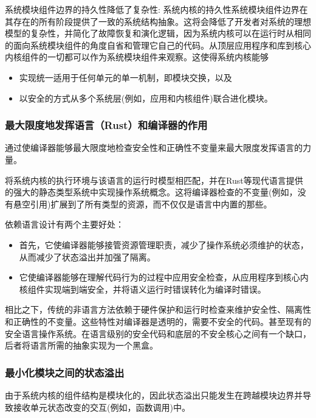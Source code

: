 系统模块组件边界的持久性降低了复杂性: 系统内核的持久性系统模块组件边界在其存在的所有阶段提供了一致的系统结构抽象。这将会降低了开发者对系统的理想模型的复杂性，并简化了故障恢复和演化逻辑，因为系统内核可以在运行时从相同的面向系统模块组件的角度自省和管理它自己的代码。从顶层应用程序和库到核心内核组件的一切都可以作为系统模块组件来观察。这使得系统内核能够

\begin{itemize}
	\item 实现统一适用于任何单元的单一机制，即模块交换，以及
	\item 以安全的方式从多个系统层(例如，应用和内核组件)联合进化模块。
\end{itemize}

\subsubsection{最大限度地发挥语言（Rust）和编译器的作用}
通过使编译器能够最大限度地检查安全性和正确性不变量来最大限度发挥语言的力量。

将系统内核的执行环境与该语言的运行时模型相匹配，并在Rust等现代语言提供的强大的静态类型系统中实现操作系统概念。这将编译器检查的不变量(例如，没有悬空引用)扩展到了所有类型的资源，而不仅仅是语言中内置的那些。

依赖语言设计有两个主要好处：

\begin{itemize}
    \item 首先，它使编译器能够接管资源管理职责，减少了操作系统必须维护的状态，从而减少了状态溢出并加强了隔离。
    \item 它使编译器能够在理解代码行为的过程中应用安全检查，从应用程序到核心内核组件实现端到端安全，并将语义运行时错误转化为编译时错误。
\end{itemize}

相比之下，传统的非语言方法依赖于硬件保护和运行时检查来维护安全性、隔离性和正确性的不变量。这些特性对编译器是透明的，需要不安全的代码。甚至现有的安全语言操作系统。在语言级别的安全代码和底层的不安全核心之间有一个缺口，后者将语言所需的抽象实现为一个黑盒。

\subsubsection{最小化模块之间的状态溢出}

由于系统内核的组件结构是模块化的，因此状态溢出只能发生在跨越模块边界并导致接收单元状态改变的交互(例如，函数调用)中。
